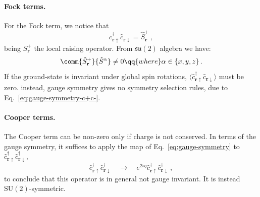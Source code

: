 \paragraph{Fock terms.} For the Fock term, we notice that
\[
	\hat c_{\mathbf{r}\uparrow}^\dagger \hat c_{\mathbf{r}\downarrow} = \hat S_\mathbf{r}^+ \, ,
\]
being $S_\mathbf{r}^+$ the local raising operator. From $\mathfrak{su}(2)$ algebra we have:
\[
	\comm{\hat S_\mathbf{r}^+}{\hat S^\alpha} \neq 0
	\qq{where}
	\alpha \in \lbrace x,y,z \rbrace \, .
\]
If the ground-state is invariant under global spin rotations, $\langle \hat c_{\mathbf{r}\uparrow}^\dagger \hat c_{\mathbf{r}\downarrow} \rangle$ must be zero. instead, gauge symmetry gives no symmetry selection rules, due to Eq.~\eqref{eq:gauge-symmetry-c+c-}.

\paragraph{Cooper terms.} The Cooper term can be non-zero only if charge is not conserved. In terms of the gauge symmetry, it suffices to apply the map of Eq.~\eqref{eq:gauge-symmetry} to $\hat c_{\mathbf{r}\uparrow}^\dagger \hat c_{\mathbf{r}\downarrow}^\dagger$,
\[
	\hat c_{\mathbf{r}\uparrow}^\dagger \hat c_{\mathbf{r}\downarrow}^\dagger
	\quad\to\quad
	e^{2i\eta} \hat c_{\mathbf{r}\uparrow}^\dagger \hat c_{\mathbf{r}\downarrow}^\dagger \, ,
\]
to conclude that this operator is in general not gauge invariant. It is instead $\mathrm{SU}(2)$-symmetric.

